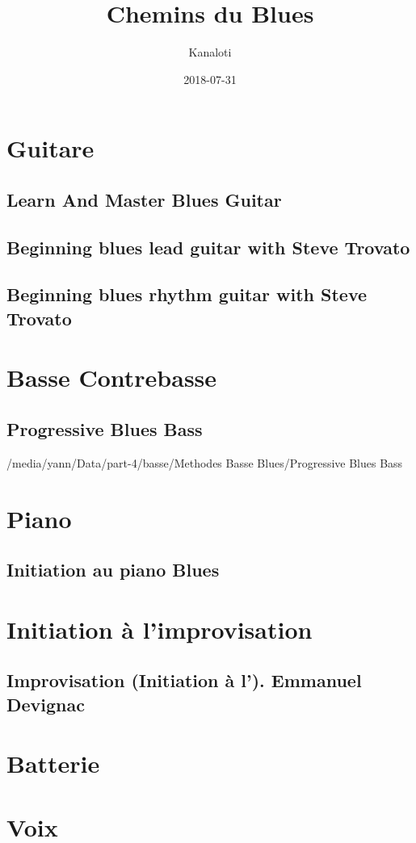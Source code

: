 \documentclass[a4paper]{book}
\title{Chemins du Blues}
\author{Kanaloti}
\date{2018-07-31}
\begin{document}
\setcounter{tocdepth}{10}
\renewcommand\contentsname{Table des mati\`eres}
\tableofcontents





\chapter[Guitare]{Guitare}

\section{Learn And Master Blues Guitar}


\section{Beginning blues lead guitar with Steve Trovato}


\section{Beginning blues rhythm guitar with Steve Trovato}

\chapter[Basse Contrebasse]{Basse Contrebasse}
\section{Progressive Blues Bass}

/media/yann/Data/part-4/basse/Methodes Basse Blues/Progressive Blues Bass

\chapter[Piano]{Piano}
\section{Initiation au piano Blues}

\chapter[Initiation à l'improvisation]{Initiation à l'improvisation}
\section{Improvisation (Initiation à l'). Emmanuel Devignac}

\chapter[Batterie]{Batterie}

\chapter[Voix]{Voix}
\end{document}

